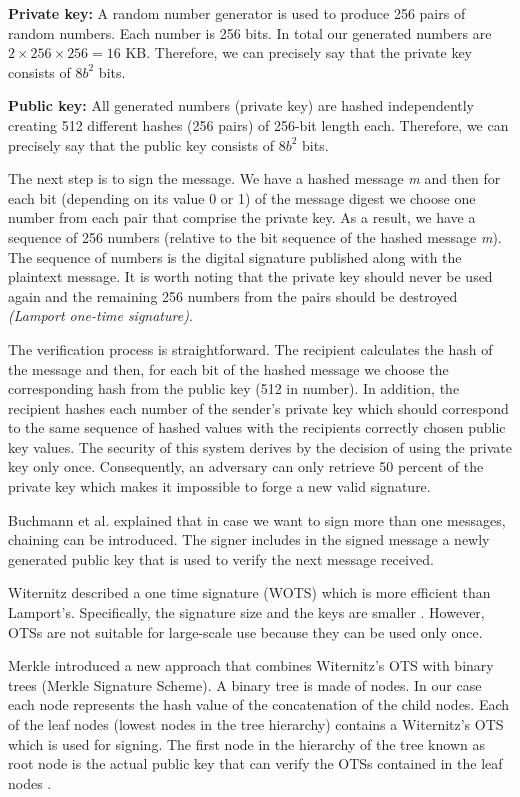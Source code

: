 \documentclass[conference, letterpaper]{IEEEtran}
\begin{document}
\textbf{Private key:} A random number generator is used to produce 256 pairs of random numbers. Each number is 256 bits. In total our generated numbers are $2\times256\times256 = 16$ KB. Therefore, we can precisely say that the private key consists of $8b^2$ bits.

\textbf{Public key:} All generated numbers (private key) are hashed independently creating 512 different hashes (256 pairs) of 256-bit length each. Therefore, we can precisely say that the public key consists of $8b^2$ bits.

The next step is to sign the message. We have a hashed message \textit{m} and then for each bit (depending on its value 0 or 1) of the message digest we choose one number from each pair that comprise the private key. As a result, we have a sequence of 256 numbers (relative to the bit sequence of the hashed message \textit{m}). The sequence of numbers is the digital signature published along with the plaintext message. It is worth noting that the private key should never be used again and the remaining 256 numbers from the pairs should be destroyed \textit{(Lamport one-time signature)}.

The verification process is straightforward. The recipient calculates the hash of the message and then, for each bit of the hashed message we choose the corresponding hash from the public key (512 in number). In addition, the recipient hashes each number of the sender's private key which should correspond to the same sequence of hashed values with the recipients correctly chosen public key values.
The security of this system derives by the decision of using the private key only once. 
Consequently, an adversary can only retrieve 50 percent of the private key which makes it impossible to forge a new valid signature.

Buchmann et al. \cite{Buchmann2010} explained that in case we want to sign more than one messages, chaining can be introduced. The signer includes in the signed message a newly generated public key that is used to verify the next message received.

Witernitz described a one time signature (WOTS) which is more efficient than Lamport's. Specifically, the signature size and the keys are smaller \cite{Improved_L-OTS_by_Merkle}. However, OTSs are not suitable for large-scale use because they can be used only once.

Merkle introduced a new approach that combines Witernitz's OTS with binary trees (Merkle Signature Scheme). A binary tree is made of nodes. In our case each node represents the hash value of the concatenation of the child nodes. Each of the leaf nodes (lowest nodes in the tree hierarchy) contains a Witernitz's OTS which is used for signing. The first node in the hierarchy of the tree known as root node is the actual public key that can verify the OTSs contained in the leaf nodes \cite{Improved_L-OTS_by_Merkle}. 
\end{document}
